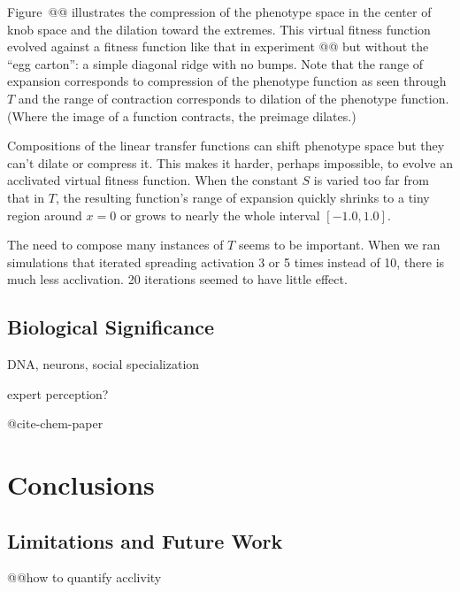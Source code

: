 \documentclass[letterpaper]{article}
\begin{document}
Figure~@@ illustrates the compression of the phenotype space in the center of
knob space and the dilation toward the extremes. This virtual fitness function
evolved against a fitness function like that in experiment @@ but without the
``egg carton'': a simple diagonal ridge with no bumps. Note that the range of
expansion corresponds to compression of the phenotype function as seen through
$T$ and the range of contraction corresponds to dilation of the phenotype
function. (Where the image of a function contracts, the preimage dilates.)

Compositions of the linear transfer functions can shift phenotype space but they
can't dilate or compress it. This makes it harder, perhaps impossible, to
evolve an acclivated virtual fitness function. When the constant $S$ is varied
too far from that in $T$, the resulting function's range of expansion quickly
shrinks to a tiny region around $x=0$ or grows to nearly the whole interval
$[-1.0, 1.0]$.

The need to compose many instances of $T$ seems to be important. When we ran
simulations that iterated spreading activation 3 or 5 times instead of 10,
there is much less acclivation. 20 iterations seemed to have little effect.

\subsection{Biological Significance}

DNA, neurons, social specialization

expert perception?

@cite-chem-paper

\section{Conclusions}

\subsection{Limitations and Future Work}

@@how to quantify acclivity



\end{document}

